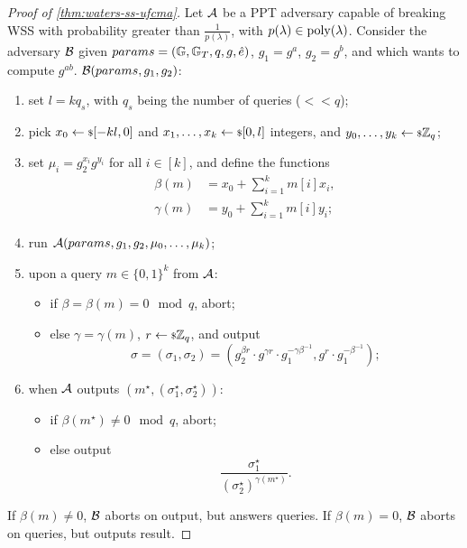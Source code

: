 \begin{proof}[Proof of \cref{thm:waters-ss-ufcma}]
	Let $\mathcal{A}$ be a \ac{PPT} adversary capable of breaking \ac{WSS} with probability greater than $\frac{1}{p(\lambda)}$, with $p(\lambda) \in \mathrm{poly}(\lambda)$.
	Consider the adversary $\mathcal{B}$ given $params = \left( \mathbb{G}, \mathbb{G}_{T}, q, g, \hat{e} \right)$, $g_1 = g^a$, $g_2 = g^b$, and which wants to compute $g^{ab}$.
	$\mathcal{B}(params, g_1, g_2)$:
	\begin{enumerate}
		\item set $l = k q_s$, with $q_s$ being the number of queries ($<< q$);
		\item pick $x_0 \leftarrow {\scriptstyle \$} {[-kl, 0]}$ and $x_1, \dots, x_k \leftarrow {\scriptstyle \$} {[0,l]}$ integers, and $y_0, \dots, y_k \leftarrow {\scriptstyle \$} {\mathbb{Z}_q}$;
		\item set $\mu_i = g_2^{x_i} g^{y_i}$ for all $i \in [k]$, and define the functions
			\begin{align*}
				\beta(m) & = x_0 + \sum_{i=1}^{k} m[i] x_i, \\
				\gamma(m) & = y_0 + \sum_{i=1}^{k} m[i] y_i;
			\end{align*}
		\item run $\mathcal{A}(params, g_1, g_2, \mu_0, \dots, \mu_k)$;
		\item upon a query $m \in \{0,1\}^{k}$ from $\mathcal{A}$:
		\begin{itemize}
			\item if $\beta = \beta(m) = 0 \mod q$, abort;
			\item else $\gamma = \gamma(m)$, $r \leftarrow {\scriptstyle \$} {\mathbb{Z}_q}$, and output
				\begin{equation*}
					\sigma = (\sigma_1, \sigma_2) = (g_2^{\beta r} \cdot g^{\gamma r} \cdot g_1^{- \gamma \beta^{-1}}, g^r \cdot g_1^{- \beta^{-1}});
				\end{equation*}
		\end{itemize}
		\item when $\mathcal{A}$ outputs $(m^{\star}, (\sigma_1^{\star}, \sigma_2^{\star}))$:
		\begin{itemize}
			\item if $\beta(m^{\star}) \neq 0 \mod q$, abort;
			\item else output
				\begin{equation*}
					\frac{\sigma_1^{\star}}{\left(\sigma_2^{\star}\right)^{\gamma(m^{\star})}}.
				\end{equation*}
		\end{itemize}
	\end{enumerate}
	If $\beta(m) \neq 0$, $\mathcal{B}$ aborts on output, but answers queries.
	If $\beta(m) = 0$, $\mathcal{B}$ aborts on queries, but outputs result.


\end{proof}
